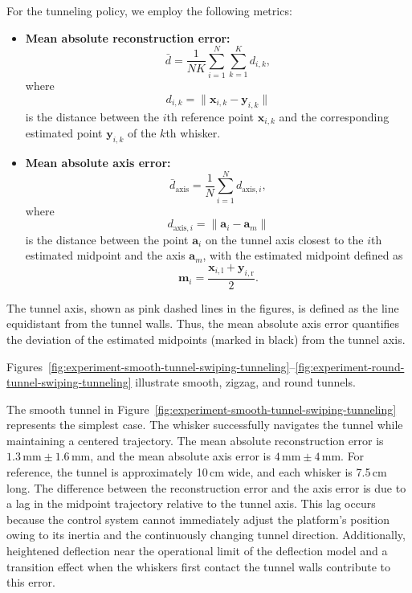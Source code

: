 For the tunneling policy, we employ the following metrics:

\begin{itemize}
    \item \textbf{Mean absolute reconstruction error:}
    \[
        \bar{d} = \frac{1}{NK}\sum_{i=1}^{N}\sum_{k=1}^{K} d_{i,k},
    \]
    where
    \[
        d_{i,k} = \|\mathbf{x}_{i,k} - \mathbf{y}_{i,k}\|
    \]
    is the distance between the $i$th reference point $\mathbf{x}_{i,k}$ and the corresponding estimated point $\mathbf{y}_{i,k}$ of the $k$th whisker.
    \item \textbf{Mean absolute axis error:}
    \[
        \bar{d}_{\mathrm{axis}} = \frac{1}{N}\sum_{i=1}^{N} d_{\mathrm{axis},i},
    \]
    where
    \[
        d_{\mathrm{axis},i} = \|\mathbf{a}_i - \mathbf{a}_m\|
    \]
    is the distance between the point $\mathbf{a}_i$ on the tunnel axis closest to the $i$th estimated midpoint and the axis $\mathbf{a}_m$, with the estimated midpoint defined as
    \[
        \mathbf{m}_i = \frac{\mathbf{x}_{i,\mathrm{l}} + \mathbf{y}_{i,\mathrm{r}}}{2}.
    \]
\end{itemize}

The tunnel axis, shown as pink dashed lines in the figures, is defined as the line equidistant from the tunnel walls.
Thus, the mean absolute axis error quantifies the deviation of the estimated midpoints (marked in black) from the tunnel axis.

Figures~\ref{fig:experiment-smooth-tunnel-swiping-tunneling}--\ref{fig:experiment-round-tunnel-swiping-tunneling} illustrate smooth, zigzag, and round tunnels.

The smooth tunnel in Figure~\ref{fig:experiment-smooth-tunnel-swiping-tunneling} represents the simplest case.
The whisker successfully navigates the tunnel while maintaining a centered trajectory.
The mean absolute reconstruction error is $1.3\,\text{mm} \pm 1.6\,\text{mm}$, and the mean absolute axis error is $4\,\text{mm} \pm 4\,\text{mm}$.
For reference, the tunnel is approximately 10\,cm wide, and each whisker is 7.5\,cm long.
The difference between the reconstruction error and the axis error is due to a lag in the midpoint trajectory relative to the tunnel axis.
This lag occurs because the control system cannot immediately adjust the platform's position owing to its inertia and the continuously changing tunnel direction.
Additionally, heightened deflection near the operational limit of the deflection model and a transition effect when the whiskers first contact the tunnel walls contribute to this error.

